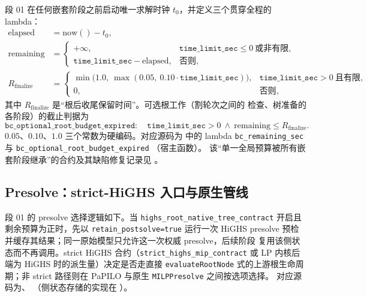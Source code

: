 段 01 在任何嵌套阶段之前启动唯一求解时钟 $t_0$，并定义三个贯穿全程的 lambda：
\begin{align}
  \mathrm{elapsed} &= \mathrm{now}()-t_0,\\
  \mathrm{remaining} &=
    \begin{cases}
      +\infty, & \texttt{time\_limit\_sec}\le 0\ \text{或非有限},\\
      \texttt{time\_limit\_sec}-\mathrm{elapsed}, & \text{否则},
    \end{cases}\\
  R_{\mathrm{finalize}} &=
    \begin{cases}
      \min\bigl(1.0,\ \max(0.05,\ 0.10\cdot\texttt{time\_limit\_sec})\bigr),
        & \texttt{time\_limit\_sec}>0\ \text{且有限},\\
      0, & \text{否则},
    \end{cases}
\end{align}
其中 $R_{\mathrm{finalize}}$ 是``根后收尾保留时间''。可选根工作（割轮次之间的
检查、树准备的各阶段）的截止判据为
\begin{equation}
  \texttt{bc\_optional\_root\_budget\_expired}:\quad
  \texttt{time\_limit\_sec}>0\ \land\ \mathrm{remaining}\le R_{\mathrm{finalize}} .
\end{equation}
$0.05$、$0.10$、$1.0$ 三个常数为硬编码。对应源码为
中的 lambda \texttt{bc\_remaining\_sec} 与 \texttt{bc\_optional\_root\_budget\_expired}
（宿主函数）。
该``单一全局预算被所有嵌套阶段继承''的合约及其缺陷修复记录见
。

\subsection{Presolve：strict-HiGHS 入口与原生管线}\label{subsec:milpbc-presolve}

段 01 的 presolve 选择逻辑如下。当 \texttt{highs\_root\_native\_tree\_contract}
开启且剩余预算为正时，先以 \texttt{retain\_postsolve=true} 运行一次 HiGHS
presolve 预检并缓存其结果；同一原始模型只允许这一次权威 presolve，后续阶段
复用该侧状态而不再调用。strict HiGHS 合约（\texttt{strict\_highs\_mip\_contract}
或 LP 内核后端为 HiGHS 时的派生量）决定是否走直接 \texttt{evaluateRootNode}
式的上游根生命周期；非 strict 路径则在 PaPILO 与原生 \texttt{MILPPresolve}
之间按选项选择。
对应源码为、
（侧状态存储的实现在 ）。

